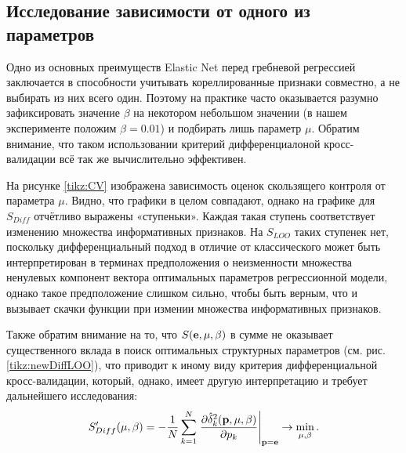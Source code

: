 \subsection{Исследование зависимости от одного из параметров}

Одно из основных преимуществ Elastic Net перед гребневой регрессией заключается в способности учитывать кореллированные признаки совместно, а не выбирать из них всего один. 
Поэтому на практике часто оказывается разумно зафиксировать значение $\beta$ на некотором небольшом значении (в нашем эксперименте положим $\beta = 0{.}01$) и подбирать лишь параметр $\mu$. 
Обратим внимание, что таком использовании критерий дифференциалоной кросс-валидации всё так же вычислительно эффективен. 

На рисунке \ref{tikz:CV} изображена зависимость оценок скользящего контроля от параметра $\mu.$ Видно, что графики в целом совпадают, однако на графике для $S_{Diff}$ отчётливо выражены «ступеньки». 
Каждая такая ступень соответствует изменению множества информативных признаков. 
На $S_{LOO}$ таких ступенек нет, поскольку дифференциальный подход в отличие от классического может быть интерпретирован в терминах предположения о неизменности множества ненулевых компонент вектора оптимальных параметров регрессионной модели, 
однако такое предположение слишком сильно, чтобы быть верным, что и вызывает скачки функции при измении множества информативных признаков.

Также обратим внимание на то, что $S(\boldsymbol{\mathbf{e}}, {\mu,\beta})$ в сумме не оказывает существенного вклада в поиск оптимальных структурных параметров (см. рис. \ref{tikz:newDiffLOO}), что приводит к иному виду критерия дифференциальной кросс-валидации, который, однако, имеет другую интерпретацию и требует дальнейшего исследования: 
\begin{equation*}
	S^\prime_{Diff}({\mu,\beta}) 
	= -\frac1N\sum\limits_{k=1}^N \left. 
		\frac{\partial\hat{\delta}_k^2(\boldsymbol{\mathbf{p}}, {\mu,\beta})}{\partial p_k} 
	\right|_{\boldsymbol{\mathbf{p}}=\boldsymbol{\mathbf{e}}} \to \mathop{\mbox{min}}\limits_{{\mu,\beta}}.
\end{equation*}

